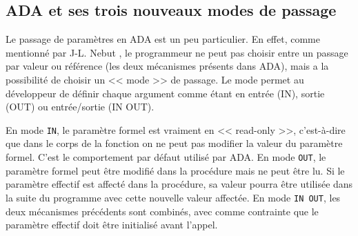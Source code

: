     \subsection{ADA et ses trois nouveaux modes de passage}
   
   Le passage de paramètres en ADA est un peu particulier. En effet, comme mentionné par J-L. Nebut \cite{opac-b1077467}, le programmeur ne peut pas choisir entre un passage par valeur ou référence (les deux mécanismes présents dans ADA), mais a la possibilité de choisir un << mode >> de passage. Le mode permet au développeur de définir chaque argument comme étant en entrée (IN), sortie (OUT) ou entrée/sortie (IN OUT).

En mode \texttt{IN}, le paramètre formel est vraiment en << read-only >>, c'est-à-dire que dans le corps de la fonction on ne peut pas modifier la valeur du paramètre formel. C'est le comportement par défaut utilisé par ADA. En mode \texttt{OUT}, le paramètre formel peut être modifié dans la procédure mais ne peut être lu. Si le paramètre effectif est affecté dans la procédure, sa valeur pourra être utilisée dans la suite du programme avec cette nouvelle valeur affectée. En mode \texttt{IN OUT}, les deux mécanismes précédents sont combinés, avec comme contrainte que le paramètre effectif doit être initialisé avant l'appel.
    
    
